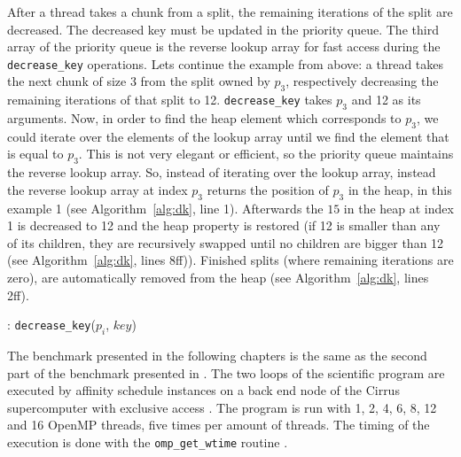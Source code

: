 \documentclass[twoside,11pt]{article}
\begin{document}
After a thread takes a chunk from a split, the remaining
iterations of the split are decreased.
The decreased key must be updated in the priority queue.
The third array of the priority queue is the reverse
lookup array for fast access during the
\texttt{decrease\_key} operations.
Lets continue the example from above: a thread takes the
next chunk of size 3 from the split owned by $p_3$,
respectively decreasing the remaining iterations of that
split to 12.
\texttt{decrease\_key} takes $p_3$ and 12 as its arguments.
Now, in order to find the heap element which corresponds
to $p_3$, we could iterate over the elements of the
lookup array until we find the element that is equal to
$p_3$.
This is not very elegant or efficient, so the priority
queue maintains the reverse lookup array.
So, instead of iterating over the lookup array, instead
the reverse lookup array at index $p_3$ returns the
position of $p_3$ in the heap, in this example 1 (see
Algorithm~\ref{alg:dk}, line 1).
Afterwards the $15$ in the heap at index 1 is decreased to
12 and the heap property is restored (if 12 is smaller than
any of its children, they are recursively swapped until no
children are bigger than 12 (see Algorithm~\ref{alg:dk},
lines 8ff)).
Finished splits (where remaining iterations are zero),
are automatically removed from the heap (see
Algorithm~\ref{alg:dk}, lines 2ff).

\begin{algorithm}
  \caption{: \texttt{decrease\_key}($p_i$, $key$)}
  \label{alg:dk}

  \begin{algorithmic}[1]
    \ELSE
      \ENDWHILE
    \ENDIF
  \end{algorithmic}
\end{algorithm}

The benchmark presented in the following chapters is the
same as the second part of the benchmark presented in
\citet{b1}.
The two loops of the scientific program are executed by
affinity schedule instances on a back end node of the
Cirrus supercomputer with exclusive access
\citep[see][]{cirrus}.
The program is run with 1, 2, 4, 6, 8, 12 and 16 OpenMP
threads, five times per amount of threads.
The timing of the execution is done with the
\texttt{omp\_get\_wtime} routine
\citep[see][Chapter 3]{omp}.
\end{document}

